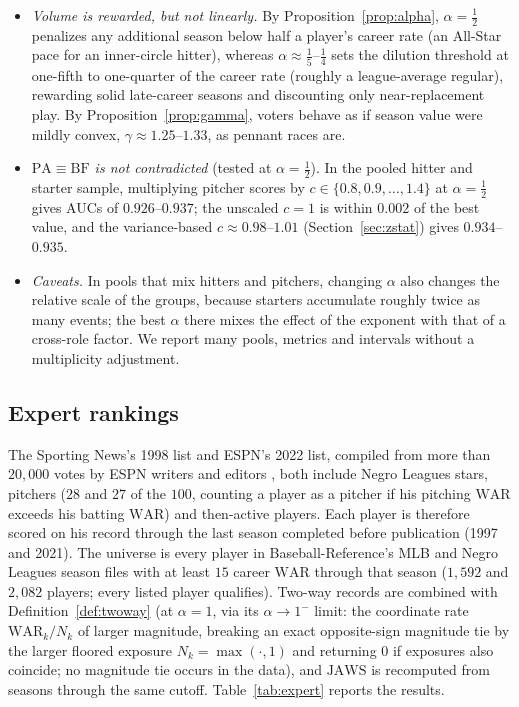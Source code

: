 \documentclass[11pt,letterpaper]{article}
\theoremstyle{plain}
\theoremstyle{definition}
\theoremstyle{remark}
\newcommand{\WAR}{\mathrm{WAR}}
\newcommand{\PA}{\mathrm{PA}}
\newcommand{\BF}{\mathrm{BF}}
\newcommand{\JAWS}{\mathrm{JAWS}}
\begin{document}
\begin{itemize}
    \item \emph{Volume is rewarded, but not linearly.} By Proposition~\ref{prop:alpha}, $\alpha = \tfrac12$ penalizes any additional season below half a player's career rate (an All-Star pace for an inner-circle hitter), whereas $\alpha \approx \tfrac15$--$\tfrac14$ sets the dilution threshold at one-fifth to one-quarter of the career rate (roughly a league-average regular), rewarding solid late-career seasons and discounting only near-replacement play. By Proposition~\ref{prop:gamma}, voters behave as if season value were mildly convex, $\gamma \approx 1.25$--$1.33$, as pennant races are.
    \item \emph{$\PA \equiv \BF$ is not contradicted} (tested at $\alpha = \tfrac12$). In the pooled hitter and starter sample, multiplying pitcher scores by $c \in \{0.8, 0.9, \ldots, 1.4\}$ at $\alpha = \tfrac12$ gives AUCs of $0.926$--$0.937$; the unscaled $c = 1$ is within $0.002$ of the best value, and the variance-based $c \approx 0.98$--$1.01$ (Section~\ref{sec:zstat}) gives $0.934$--$0.935$.
    \item \emph{Caveats.} In pools that mix hitters and pitchers, changing $\alpha$ also changes the relative scale of the groups, because starters accumulate roughly twice as many events; the best $\alpha$ there mixes the effect of the exponent with that of a cross-role factor. We report many pools, metrics and intervals without a multiplicity adjustment.
\end{itemize}

\subsection{Expert rankings}
\label{sec:expert}

The Sporting News's 1998 list \cite{tsn1998} and ESPN's 2022 list, compiled from more than $20{,}000$ votes by ESPN writers and editors \cite{espn2022}, both include Negro Leagues stars, pitchers ($28$ and $27$ of the $100$, counting a player as a pitcher if his pitching $\WAR$ exceeds his batting $\WAR$) and then-active players. Each player is therefore scored on his record through the last season completed before publication (1997 and 2021). The universe is every player in Baseball-Reference's MLB and Negro Leagues season files with at least $15$ career $\WAR$ through that season ($1{,}592$ and $2{,}082$ players; every listed player qualifies). Two-way records are combined with Definition~\ref{def:twoway} (at $\alpha = 1$, via its $\alpha \to 1^-$ limit: the coordinate rate $\WAR_k/N_k$ of larger magnitude, breaking an exact opposite-sign magnitude tie by the larger floored exposure $N_k = \max(\cdot, 1)$ and returning $0$ if exposures also coincide; no magnitude tie occurs in the data), and $\JAWS$ is recomputed from seasons through the same cutoff. Table~\ref{tab:expert} reports the results.
\end{document}
